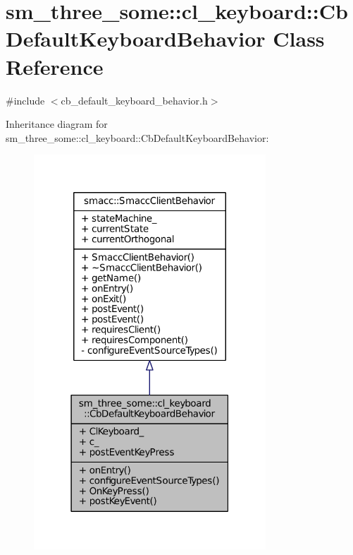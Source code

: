 \hypertarget{classsm__three__some_1_1cl__keyboard_1_1CbDefaultKeyboardBehavior}{}\section{sm\+\_\+three\+\_\+some\+:\+:cl\+\_\+keyboard\+:\+:Cb\+Default\+Keyboard\+Behavior Class Reference}
\label{classsm__three__some_1_1cl__keyboard_1_1CbDefaultKeyboardBehavior}


{\ttfamily \#include $<$cb\+\_\+default\+\_\+keyboard\+\_\+behavior.\+h$>$}



Inheritance diagram for sm\+\_\+three\+\_\+some\+:\+:cl\+\_\+keyboard\+:\+:Cb\+Default\+Keyboard\+Behavior\+:
\nopagebreak
\begin{figure}[H]
\begin{center}
\leavevmode
\includegraphics[width=247pt]{classsm__three__some_1_1cl__keyboard_1_1CbDefaultKeyboardBehavior__inherit__graph}
\end{center}
\end{figure}


